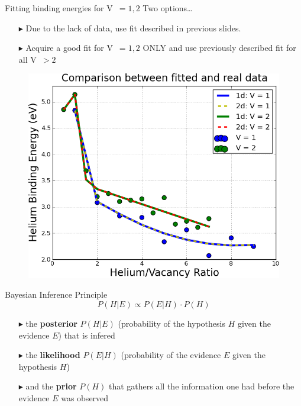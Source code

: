 \documentclass[10pt]{beamer}
\begin{document}
\begin{frame}{Fitting binding energies for V~$= 1,2$}
     \vspace{3mm}
     \large
     Two options\ldots
     \begin{itemize}
           \item[$\blacktriangleright$] Due to the lack of data, use fit 
			described
           in previous slides.
           \item[$\blacktriangleright$] Acquire a good fit for V~$= 1,2$ 
			ONLY and
           use previously described fit for all V~$> 2$ \newline
     \end{itemize}
     \normalsize
     \vspace{-1.5mm}
     \begin{figure}
         \includegraphics[width=0.6\linewidth]{V1_2_fit}
     \end{figure}
\end{frame}

\begin{frame}{Bayesian Inference Principle}
	\Large
	$$P(H|E) \propto P(E|H) \cdot P(H)$$ \newline

	\large
	\begin{itemize}
  		\item[$\blacktriangleright$] the \textbf{posterior} $P(H|E)$ (probability of
  		the hypothesis $H$ given the evidence $E$) that is infered
  		\item[$\blacktriangleright$] the \textbf{likelihood} $P(E|H)$ (probability
  		of the evidence $E$ given the hypothesis $H$)
  		\item[$\blacktriangleright$] and the \textbf{prior} $P(H)$ that gathers all
  		the information one had before the evidence $E$ was observed
	\end{itemize}
	
\end{frame}
\end{document}
